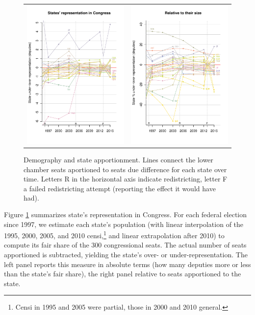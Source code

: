 \documentclass[letter,12pt]{article}
\begin{document}
\begin{figure}
\begin{center}
  \begin{tabular}{cc}
    \includegraphics[width=.45\columnwidth]{statesUnderOverRep.pdf} & 
    \includegraphics[width=.45\columnwidth]{statesUnderOverRep-rel.pdf} \\ 
  \end{tabular}
  \caption{Demography and state apportionment. Lines connect the lower chamber seats aportioned to seats due difference for each state over time. Letters R in the horizontal axis indicate redistricting, letter F a failed redistricting attempt (reporting the effect it would have had).}\label{F:underOverRep}
\end{center}
\end{figure}

Figure \ref{F:underOverRep} summarizes state's representation in Congress. For each federal election since 1997, we estimate each state's population (with linear interpolation of the 1995, 2000, 2005, and 2010 censi,\footnote{Censi in 1995 and 2005 were partial, those in 2000 and 2010 general.} and linear extrapolation after 2010) to compute its fair share of the 300 congressional seats. The actual number of seats apportioned is subtracted, yielding the state's over- or under-representation. The left panel reports this measure in absolute terms (how many deputies more or less than the state's fair share), the right panel relative to seats apportioned to the state.  
\end{document}

